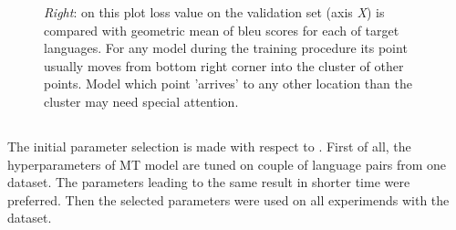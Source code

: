 \begin{figure}[h]
{		\emph{Right}: on this plot loss value on the validation set (axis \emph{X})
		is compared with geometric mean of \acrshort{bleu} scores
		for each of target languages.
		For any model during the training procedure its point usually moves from
		bottom right corner into the cluster of other points.
		Model which point 'arrives' to any other location than the cluster may need
		special attention.
	}
	\label{fig:inspect-convergence}
\end{figure}



\subsection{}

The initial parameter selection is made with respect to \cite{training-tips}.
First of all, the hyperparameters of MT model are tuned
on couple of language pairs from one dataset.
The parameters leading to the same result in shorter time were preferred.
Then the selected parameters were used on all experimends with the dataset.
